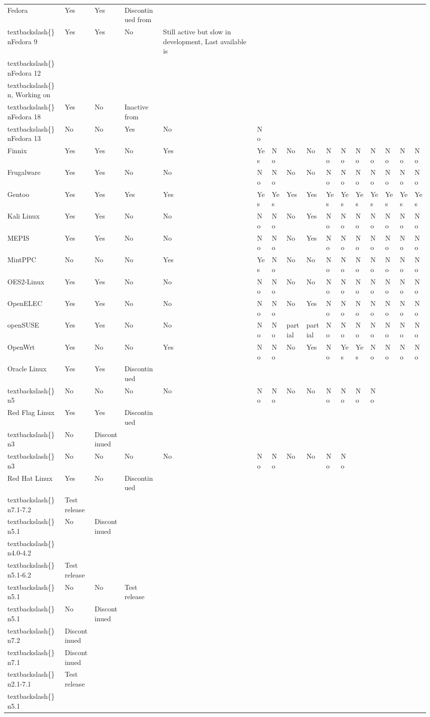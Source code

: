 \documentclass{article}
\begin{document}
\begin{tabular}{llllllllllllllll}
Fedora & Yes & Yes & Discontinued from\\textbackslash\{\}nFedora 9 & Yes & Yes & No & Still active but slow in development, Last available is\\textbackslash\{\}nFedora 12\\textbackslash\{\}n, Working on\\textbackslash\{\}nFedora 18 & Yes & No & Inactive from\\textbackslash\{\}nFedora 13 & No & No & Yes & No & No \\
Finnix & Yes & Yes & No & Yes & Yes & No & No & No & No & No & No & No & No & No & No \\
Frugalware & Yes & Yes & No & No & No & No & No & No & No & No & No & No & No & No & No \\
Gentoo & Yes & Yes & Yes & Yes & Yes & Yes & Yes & Yes & Yes & Yes & Yes & Yes & Yes & Yes & Yes \\
Kali Linux & Yes & Yes & No & No & No & No & No & Yes & No & No & No & No & No & No & No \\
MEPIS & Yes & Yes & No & No & No & No & No & Yes & No & No & No & No & No & No & No \\
MintPPC & No & No & No & Yes & Yes & No & No & No & No & No & No & No & No & No & No \\
OES2-Linux & Yes & Yes & No & No & No & No & No & No & No & No & No & No & No & No & No \\
OpenELEC & Yes & Yes & No & No & No & No & No & Yes & No & No & No & No & No & No & No \\
openSUSE & Yes & Yes & No & No & No & No & partial & partial & No & No & No & No & No & No & No \\
OpenWrt & Yes & No & No & Yes & No & No & No & Yes & No & Yes & Yes & No & No & No & No \\
Oracle Linux & Yes & Yes & Discontinued\\textbackslash\{\}n5 & No & No & No & No & No & No & No & No & No & No & No & No \\
Red Flag Linux & Yes & Yes & Discontinued\\textbackslash\{\}n3 & No & Discontinued\\textbackslash\{\}n3 & No & No & No & No & No & No & No & No & No & No \\
Red Hat Linux & Yes & No & Discontinued\\textbackslash\{\}n7.1-7.2 & Test release\\textbackslash\{\}n5.1 & No & Discontinued\\textbackslash\{\}n4.0-4.2\\textbackslash\{\}n5.1-6.2 & Test release\\textbackslash\{\}n5.1 & No & No & Test release\\textbackslash\{\}n5.1 & No & Discontinued\\textbackslash\{\}n7.2 & Discontinued\\textbackslash\{\}n7.1 & Discontinued\\textbackslash\{\}n2.1-7.1 & Test release\\textbackslash\{\}n5.1 \\

\end{tabular}
\end{document}
